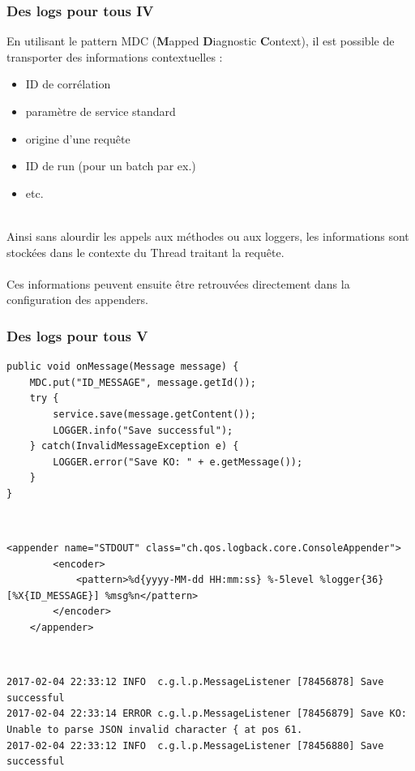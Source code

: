 \begin{frame}[fragile]
	\frametitle{Des logs pour tous IV}

    En utilisant le pattern MDC (\textbf{M}apped \textbf{D}iagnostic \textbf{C}ontext), il est possible de transporter des informations contextuelles : 
    \begin{itemize}
    	\item ID de corr\'{e}lation
        \item param\`{e}tre de service standard
        \item origine d'une requ\^{e}te
        \item ID de run (pour un batch par ex.)
        \item etc.
    \end{itemize}
    ~\\
    Ainsi sans alourdir les appels aux m\'{e}thodes ou aux loggers, les informations sont stock\'{e}es dans le contexte du Thread traitant la requ\^{e}te.
    \\~\\
    Ces informations peuvent ensuite \^{e}tre retrouv\'{e}es directement dans la configuration des appenders.
\end{frame}

\begin{frame}[fragile]
	\frametitle{Des logs pour tous V}

    \begin{lstlisting}[basicstyle=\tiny]
public void onMessage(Message message) {
    MDC.put("ID_MESSAGE", message.getId());
    try {
        service.save(message.getContent());
        LOGGER.info("Save successful");
    } catch(InvalidMessageException e) {
        LOGGER.error("Save KO: " + e.getMessage());
    }
}
    \end{lstlisting}
    ~\\
    \begin{lstlisting}[basicstyle=\tiny]
	<appender name="STDOUT" class="ch.qos.logback.core.ConsoleAppender">
		<encoder>
      		<pattern>%d{yyyy-MM-dd HH:mm:ss} %-5level %logger{36} [%X{ID_MESSAGE}] %msg%n</pattern>
    	</encoder>
	</appender>
    \end{lstlisting}
    ~\\
    \begin{lstlisting}[basicstyle=\tiny]
2017-02-04 22:33:12 INFO  c.g.l.p.MessageListener [78456878] Save successful
2017-02-04 22:33:14 ERROR c.g.l.p.MessageListener [78456879] Save KO: Unable to parse JSON invalid character { at pos 61.
2017-02-04 22:33:12 INFO  c.g.l.p.MessageListener [78456880] Save successful
    \end{lstlisting}
\end{frame}

